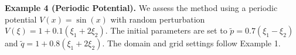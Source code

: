 \documentclass[preprint,11pt]{elsarticle}
\begin{document}






\textbf{Example 4 (Periodic Potential).} 
We assess the method using a periodic potential $V(x)=\sin(x)$ with random perturbation $V(\xi)=1+0.1(\xi_1+2\xi_2)$. The initial parameters are set to $\tilde{p}=0.7(\xi_1-\xi_2)$ and $\tilde{q}=1+0.8(\xi_1+2\xi_2)$. The domain and grid settings follow Example 1.
\end{document}
